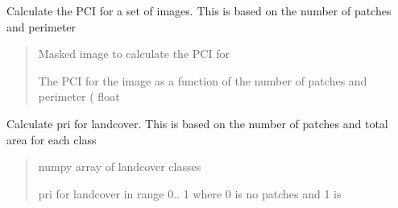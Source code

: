 \documentclass[letterpaper,10pt,english]{article}
\begin{document}

\begin{fulllineitems}
\label{\detokenize{indexes_func:indexes_func.calc_pci}}
\pysigstartsignatures
{}
\pysigstopsignatures
\sphinxAtStartPar
Calculate the PCI for a set of images. This is based on the number of patches and perimeter
\begin{quote}\begin{description}
\sphinxAtStartPar
{} \textendash{} Masked image to calculate the PCI for

\sphinxAtStartPar
The PCI for the image as a function of the number of patches and perimeter ( float

\end{description}\end{quote}

\end{fulllineitems}


\begin{fulllineitems}
\label{\detokenize{indexes_func:indexes_func.calc_pri}}
\pysigstartsignatures
{}
\pysigstopsignatures
\sphinxAtStartPar
Calculate pri for landcover. This is based on the number of patches and total area for each class
\begin{quote}\begin{description}
\sphinxAtStartPar
{} \textendash{} numpy array of landcover classes

\sphinxAtStartPar
pri for landcover in range 0.. 1 where 0 is no patches and 1 is

\end{description}\end{quote}

\end{fulllineitems}

\end{document}
